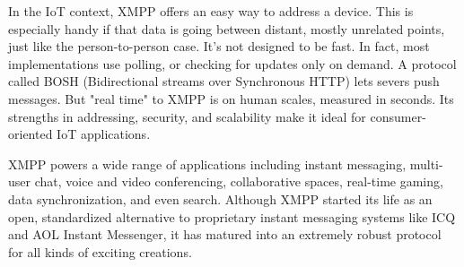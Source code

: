       In the IoT context, XMPP offers an easy way to address a device. This is especially handy if that data is going between distant, mostly unrelated points, just like the person-to-person case. It’s not designed to be fast. In fact, most implementations use polling, or checking for updates only on demand. A protocol called BOSH (Bidirectional streams over Synchronous HTTP) lets severs push messages. But "real time" to XMPP is on human scales, measured in seconds. Its strengths in addressing, security, and scalability make it ideal for consumer-oriented IoT applications.

      XMPP powers a wide range of applications including instant messaging, multi-user chat, voice and video conferencing, collaborative spaces, real-time gaming, data synchronization, and even search. Although XMPP started its life as an open, standardized alternative to proprietary instant messaging systems like ICQ and AOL Instant Messenger, it has matured into an extremely robust protocol for all kinds of exciting creations.

